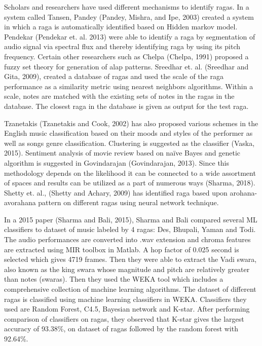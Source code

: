 \doublespacing
\setlength{\parindent}{1cm}

Scholars and researchers have used different mechanisms to identify ragas. In a system called Tansen, Pandey (Pandey, Mishra, and Ipe, 2003) created a system in which a raga is automatically identified based on Hidden markov model. Pendekar (Pendekar et. al. 2013) were able to identify a raga by segmentation of audio signal via spectral flux and thereby identifying raga by using its pitch frequency. Certain other researchers such as Chelpa (Chelpa, 1991) proposed a fuzzy set theory for generation of alap patterns. Sreedhar et. al. (Sreedhar and Gita, 2009), created a database of ragas and used the scale of the raga performance as a similarity metric using nearest neighbors algorithms. Within a scale, notes are matched with the existing sets of notes in the ragas in the database. The closest raga in the database is given as output for the test raga.
\par
Tzanetakis (Tzanetakis and Cook, 2002) has also proposed various schemes in the English music classification based on their moods and styles of the performer as well as songs genre classification. Clustering is suggested as the classifier (Vaska, 2015). Sentiment analysis of movie review based on naïve Bayes and genetic algorithm is suggested in Govindarajan (Govindarajan, 2013). Since this methodology depends on the likelihood it can be connected to a wide assortment of spaces and results can be utilized as a part of numerous ways (Sharma, 2018). Shetty et. al., (Shetty and Achary, 2009) has identified raga based upon arohana-avorahana pattern on different ragas using neural network technique.
\par
In a 2015 paper (Sharma and Bali, 2015), Sharma and Bali compared several ML classifiers to dataset of music labeled by 4 ragas: Des, Bhupali, Yaman and Todi. The audio performances are converted into .wav extension and chroma features are extracted using MIR toolbox in Matlab. A hop factor of 0.025 second is selected which gives 4719 frames. Then they were able to extract the Vadi swara, also known as the king swara whose magnitude and pitch are relatively greater than notes (swaras). Then they used the WEKA tool which includes a comprehensive collection of machine learning algorithms. The dataset of different ragas is classified using machine learning classifiers in WEKA. Classifiers they used are Random Forest, C4.5, Bayesian network and K-star. After performing comparison of classifiers on ragas, they observed that K-star gives the largest accuracy of 93.38\%, on dataset of ragas followed by the random forest with 92.64\%.
